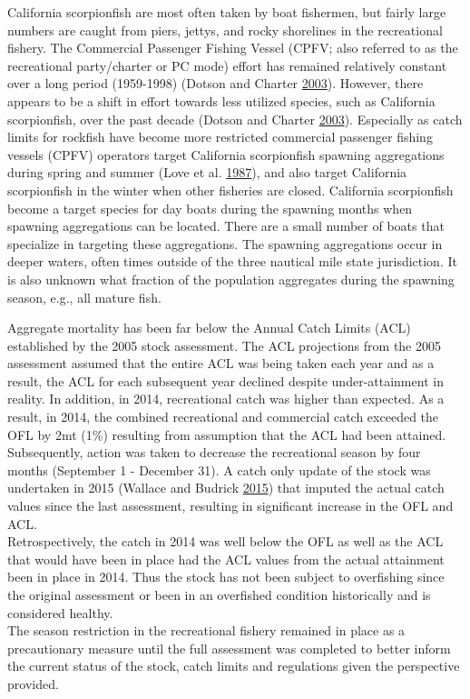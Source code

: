 \documentclass[12pt,]{article}
\begin{document}
California scorpionfish are most often taken by boat fishermen, but
fairly large numbers are caught from piers, jettys, and rocky shorelines
in the recreational fishery. The Commercial Passenger Fishing Vessel
(CPFV; also referred to as the recreational party/charter or PC mode)
effort has remained relatively constant over a long period (1959-1998)
(Dotson and Charter \protect\hyperlink{ref-Dotson2003}{2003}). However,
there appears to be a shift in effort towards less utilized species,
such as California scorpionfish, over the past decade (Dotson and
Charter \protect\hyperlink{ref-Dotson2003}{2003}). Especially as catch
limits for rockfish have become more restricted commercial passenger
fishing vessels (CPFV) operators target California scorpionfish spawning
aggregations during spring and summer (Love et al.
\protect\hyperlink{ref-Love1987}{1987}), and also target California
scorpionfish in the winter when other fisheries are closed. California
scorpionfish become a target species for day boats during the spawning
months when spawning aggregations can be located. There are a small
number of boats that specialize in targeting these aggregations. The
spawning aggregations occur in deeper waters, often times outside of the
three nautical mile state jurisdiction. It is also unknown what fraction
of the population aggregates during the spawning season, e.g., all
mature fish.

Aggregate mortality has been far below the Annual Catch Limits (ACL)
established by the 2005 stock assessment. The ACL projections from the
2005 assessment assumed that the entire ACL was being taken each year
and as a result, the ACL for each subsequent year declined despite
under-attainment in reality. In addition, in 2014, recreational catch
was higher than expected. As a result, in 2014, the combined
recreational and commercial catch exceeded the OFL by 2mt (1\%)
resulting from assumption that the ACL had been attained. Subsequently,
action was taken to decrease the recreational season by four months
(September 1 - December 31). A catch only update of the stock was
undertaken in 2015 (Wallace and Budrick
\protect\hyperlink{ref-Wallace2015}{2015}) that imputed the actual catch
values since the last assessment, resulting in significant increase in
the OFL and ACL.\\
Retrospectively, the catch in 2014 was well below the OFL as well as the
ACL that would have been in place had the ACL values from the actual
attainment been in place in 2014. Thus the stock has not been subject to
overfishing since the original assessment or been in an overfished
condition historically and is considered healthy.\\
The season restriction in the recreational fishery remained in place as
a precautionary measure until the full assessment was completed to
better inform the current status of the stock, catch limits and
regulations given the perspective provided.
\end{document}
